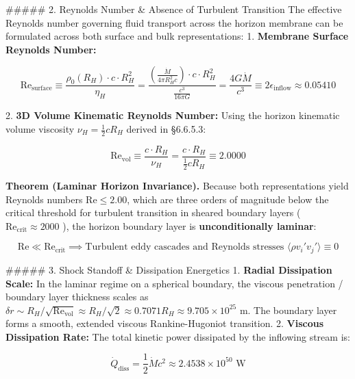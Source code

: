 \documentclass[11pt,a4paper]{article}
\theoremstyle{definition}
\theoremstyle{remark}
\begin{document}
\#\#\#\#\# 2. Reynolds Number \& Absence of Turbulent Transition
The effective Reynolds number governing fluid transport across the horizon membrane can be formulated across both surface and bulk representations:
1. \textbf{Membrane Surface Reynolds Number:}


\begin{equation}
\mathrm{Re}_{\text{surface}} \equiv \frac{\rho_0(R_H) \cdot c \cdot R_H^2}{\eta_H} = \frac{(\frac{\dot{M}}{4\pi R_H^2 c}) \cdot c \cdot R_H^2}{\frac{c^3}{16\pi G}} = \frac{4 G \dot{M}}{c^3} \equiv 2\epsilon_{\text{inflow}} \approx 0.05410
\end{equation}


2. \textbf{3D Volume Kinematic Reynolds Number:}
Using the horizon kinematic volume viscosity $\nu_H = \frac{1}{2} c R_H$ derived in \S 6.6.5.3:


\begin{equation}
\mathrm{Re}_{\text{vol}} \equiv \frac{c \cdot R_H}{\nu_H} = \frac{c \cdot R_H}{\frac{1}{2} c R_H} \equiv 2.0000
\end{equation}


\textbf{Theorem (Laminar Horizon Invariance).} Because both representations yield Reynolds numbers $\mathrm{Re} \le 2.00$, which are three orders of magnitude below the critical threshold for turbulent transition in sheared boundary layers ( $\mathrm{Re}_{\text{crit}} \approx 2000$ ), the horizon boundary layer is \textbf{unconditionally laminar}:


\begin{equation}
\mathrm{Re} \ll \mathrm{Re}_{\text{crit}} \implies \text{Turbulent eddy cascades and Reynolds stresses } \langle \rho v_i' v_j' \rangle \equiv 0
\end{equation}


\#\#\#\#\# 3. Shock Standoff \& Dissipation Energetics
1. \textbf{Radial Dissipation Scale:} In the laminar regime on a spherical boundary, the viscous penetration / boundary layer thickness scales as $\delta r \sim R_H / \sqrt{\mathrm{Re}_{\text{vol}}} \approx R_H / \sqrt{2} \approx 0.7071 R_H \approx 9.705 \times 10^{25}\text{ m}$. The boundary layer forms a smooth, extended viscous Rankine-Hugoniot transition.
2. \textbf{Viscous Dissipation Rate:} The total kinetic power dissipated by the inflowing stream is:


\begin{equation}
\dot{Q}_{\text{diss}} = \frac{1}{2} \dot{M} c^2 \approx 2.4538 \times 10^{50}\text{ W}
\end{equation}
\end{document}
